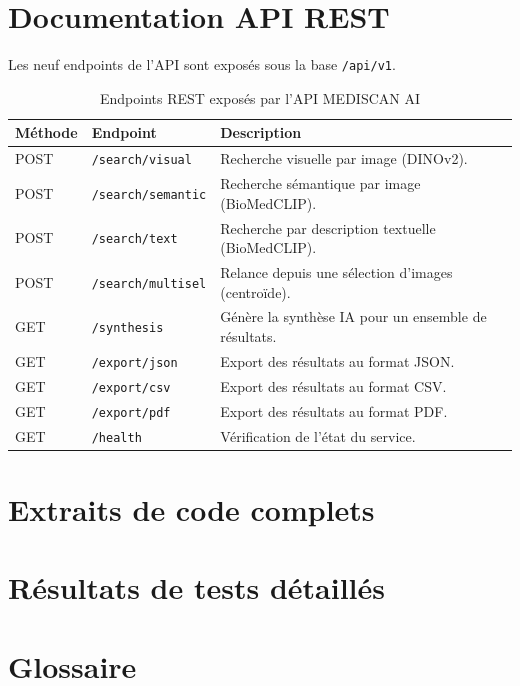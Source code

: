 \documentclass[12pt,a4paper]{article}
\begin{document}
\section{Documentation API REST}

Les neuf endpoints de l'API sont exposés sous la base \texttt{/api/v1}.

\vspace{0.3cm}
\begin{table}[H]
\centering
\begin{tabularx}{\textwidth}{@{}llX@{}}
\toprule
\textbf{Méthode} & \textbf{Endpoint} & \textbf{Description} \\
\midrule
POST & \texttt{/search/visual}    & Recherche visuelle par image (DINOv2). \\
POST & \texttt{/search/semantic}  & Recherche sémantique par image (BioMedCLIP). \\
POST & \texttt{/search/text}      & Recherche par description textuelle (BioMedCLIP). \\
POST & \texttt{/search/multisel}  & Relance depuis une sélection d'images (centroïde). \\
GET  & \texttt{/synthesis}        & Génère la synthèse IA pour un ensemble de résultats. \\
GET  & \texttt{/export/json}      & Export des résultats au format JSON. \\
GET  & \texttt{/export/csv}       & Export des résultats au format CSV. \\
GET  & \texttt{/export/pdf}       & Export des résultats au format PDF. \\
GET  & \texttt{/health}           & Vérification de l'état du service. \\
\bottomrule
\end{tabularx}
\caption{Endpoints REST exposés par l'API MEDISCAN AI}
\label{tab:api-rest}
\end{table}

\section{Extraits de code complets}

\section{Résultats de tests détaillés}

\section{Glossaire}
\end{document}
